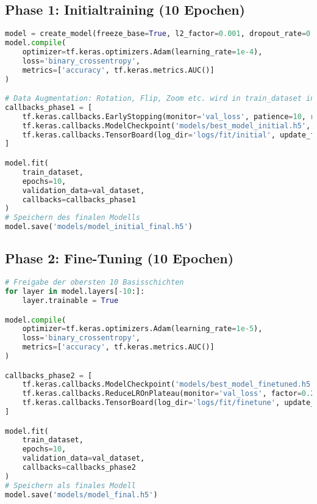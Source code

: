 \subsection{Phase 1: Initialtraining (10 Epochen)}
\begin{lstlisting}[language=Python, caption=Initialtraining in \texttt{train\_model.py}]
model = create_model(freeze_base=True, l2_factor=0.001, dropout_rate=0.5)
model.compile(
    optimizer=tf.keras.optimizers.Adam(learning_rate=1e-4),
    loss='binary_crossentropy',
    metrics=['accuracy', tf.keras.metrics.AUC()]
)

# Data Augmentation: Rotation, Flip, Zoom etc. wird in train_dataset integriert
callbacks_phase1 = [
    tf.keras.callbacks.EarlyStopping(monitor='val_loss', patience=10, restore_best_weights=True),
    tf.keras.callbacks.ModelCheckpoint('models/best_model_initial.h5', monitor='val_accuracy', save_best_only=True),
    tf.keras.callbacks.TensorBoard(log_dir='logs/fit/initial', update_freq='epoch')
]

model.fit(
    train_dataset,
    epochs=10,
    validation_data=val_dataset,
    callbacks=callbacks_phase1
)
# Speichern des finalen Modells
model.save('models/model_initial_final.h5')
\end{lstlisting}

\subsection*{Phase 2: Fine-Tuning (10 Epochen)}
\begin{lstlisting}[language=Python, caption=Fine-Tuning in \texttt{train\_model.py}]
# Freigabe der obersten 10 Basisschichten
for layer in model.layers[-10:]:
    layer.trainable = True

model.compile(
    optimizer=tf.keras.optimizers.Adam(learning_rate=1e-5),
    loss='binary_crossentropy',
    metrics=['accuracy', tf.keras.metrics.AUC()]
)

callbacks_phase2 = [
    tf.keras.callbacks.ModelCheckpoint('models/best_model_finetuned.h5', monitor='val_accuracy', save_best_only=True),
    tf.keras.callbacks.ReduceLROnPlateau(monitor='val_loss', factor=0.2, patience=2, min_lr=1e-7),
    tf.keras.callbacks.TensorBoard(log_dir='logs/fit/finetune', update_freq='epoch')
]

model.fit(
    train_dataset,
    epochs=10,
    validation_data=val_dataset,
    callbacks=callbacks_phase2
)
# Speichern als finales Modell
model.save('models/model_final.h5')
\end{lstlisting}

